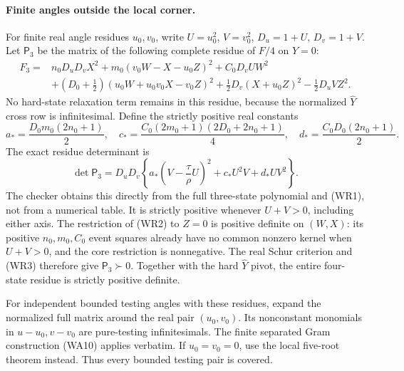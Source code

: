 \paragraph{Finite angles outside the local corner.}
For finite real angle residues $u_0,v_0$, write $U=u_0^2$,
$V=v_0^2$, $D_u=1+U$, $D_v=1+V$. Let $\mathsf P_3$ be the
matrix of the following complete residue of $F/4$ on $Y=0$:
\[
 \begin{split}
 F_3={}&n_0D_uD_vX^2+m_0(v_0W-X-u_0Z)^2
                    +C_0D_vU W^2\\
 &+(D_0+\tfrac12)(u_0W+u_0v_0X-v_0Z)^2
       +\tfrac12D_v(X+u_0Z)^2-\tfrac12D_uVZ^2.
 \end{split}                                           \tag{WR2}
\]
No hard-state relaxation term remains in this residue, because
the normalized $\widehat Y$ cross row is infinitesimal. Define
the strictly positive real constants
\[
 a_*=\frac{D_0m_0(2n_0+1)}2,\quad
 c_* =\frac{C_0(2m_0+1)(2D_0+2n_0+1)}4,\quad
 d_* =\frac{C_0D_0(2n_0+1)}2.
\]
The exact residue determinant is
\[
 \det\mathsf P_3=D_uD_v
 \left\{a_*\left(V-\frac\tau\rho U\right)^2
                         +c_*U^2V+d_*UV^2\right\}.    \tag{WR3}
\]
The checker obtains this directly from the full three-state
polynomial and (WR1), not from a numerical table. It is strictly
positive whenever $U+V>0$, including either axis. The restriction
of (WR2) to $Z=0$ is positive definite on $(W,X)$: its positive
$n_0,m_0,C_0$ event squares already have no common nonzero kernel
when $U+V>0$, and the core restriction is nonnegative. The real
Schur criterion and (WR3) therefore give
$\mathsf P_3\succ0$. Together with the hard $\widehat Y$ pivot,
the entire four-state residue is strictly positive definite.

For independent bounded testing angles with these residues,
expand the normalized full matrix around the real pair
$(u_0,v_0)$. Its nonconstant monomials in $u-u_0,v-v_0$ are
pure-testing infinitesimals. The finite separated Gram construction
(WA10) applies verbatim. If $u_0=v_0=0$, use the local five-root
theorem instead. Thus every bounded testing pair is covered.

